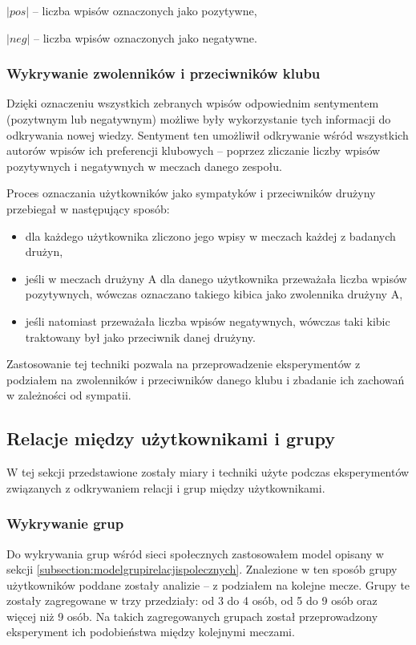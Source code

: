 $|pos|$ -- liczba wpisów oznaczonych jako pozytywne,

$|neg|$ -- liczba wpisów oznaczonych jako negatywne.



\subsubsection{Wykrywanie zwolenników i przeciwników klubu}
\label{subsubsection:wykrywaniezwolennikow}

Dzięki oznaczeniu wszystkich zebranych wpisów odpowiednim sentymentem
(pozytwnym lub negatywnym) możliwe były wykorzystanie tych informacji do
odkrywania nowej wiedzy. Sentyment ten umożliwił odkrywanie wśród wszystkich
autorów wpisów ich preferencji klubowych -- poprzez zliczanie liczby wpisów
pozytywnych i negatywnych w meczach danego zespołu.

Proces oznaczania użytkowników jako sympatyków i przeciwników drużyny przebiegał
w następujący sposób:
\begin{itemize}
  \item dla każdego użytkownika zliczono jego wpisy w meczach każdej z badanych 
  drużyn,
  \item jeśli w meczach drużyny A dla danego użytkownika przeważała liczba 
  wpisów pozytywnych, wówczas oznaczano takiego kibica jako zwolennika drużyny A,
  \item jeśli natomiast przeważała liczba wpisów negatywnych, wówczas taki kibic
  traktowany był jako przeciwnik danej drużyny.  
\end{itemize} 

Zastosowanie tej techniki pozwala na przeprowadzenie eksperymentów z podziałem
na zwolenników i przeciwników danego klubu i zbadanie ich zachowań w zależności
od sympatii.




\subsection{Relacje między użytkownikami i grupy}
\label{subsection:miary-relacje}
W tej sekcji przedstawione zostały miary i techniki użyte podczas eksperymentów
związanych z odkrywaniem relacji i grup między użytkownikami.

\subsubsection{Wykrywanie grup}
\label{subsubsection:koncepcja-wykrywaniegrup}
Do wykrywania grup wśród sieci społecznych zastosowałem model opisany w sekcji
\ref{subsection:modelgrupirelacjispolecznych}. Znalezione w ten sposób grupy
użytkowników poddane zostały analizie -- z podziałem na kolejne mecze.
Grupy te zostały zagregowane w trzy przedziały: od 3 do 4 osób, od 5 do 9 osób
oraz więcej niż 9 osób. Na takich zagregowanych grupach został przeprowadzony
eksperyment ich podobieństwa między kolejnymi meczami.

